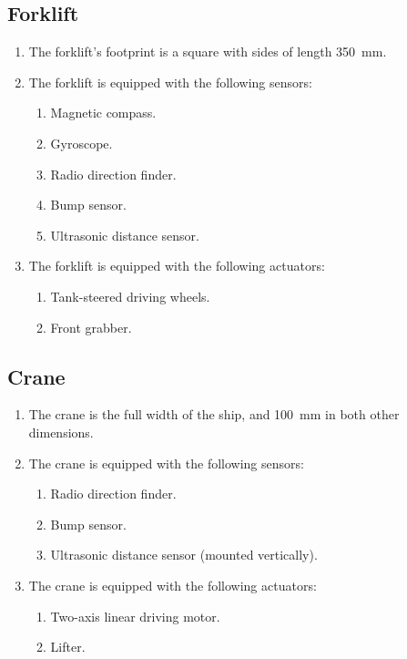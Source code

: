 \subsection{Forklift}
\label{spec:forklift}

\begin{enumerate}
  \item The forklift's footprint is a square with sides of length \SI{350}{mm}.
  \item The forklift is equipped with the following sensors:
  \begin{enumerate}
    \item Magnetic compass.
    \item Gyroscope.
    \item Radio direction finder.
    \item Bump sensor.
    \item Ultrasonic distance sensor.
  \end{enumerate}
  \item The forklift is equipped with the following actuators:
  \begin{enumerate}
    \item Tank-steered driving wheels.
    \item Front grabber.
  \end{enumerate}
\end{enumerate}

\subsection{Crane}
\label{spec:crane}

\begin{enumerate}
  \item The crane is the full width of the ship, and \SI{100}{mm}
        in both other dimensions.
  \item The crane is equipped with the following sensors:
  \begin{enumerate}
    \item Radio direction finder.
    \item Bump sensor.
    \item Ultrasonic distance sensor (mounted vertically).
  \end{enumerate}
  \item The crane is equipped with the following actuators:
  \begin{enumerate}
    \item Two-axis linear driving motor.
    \item Lifter.
  \end{enumerate}
\end{enumerate}
